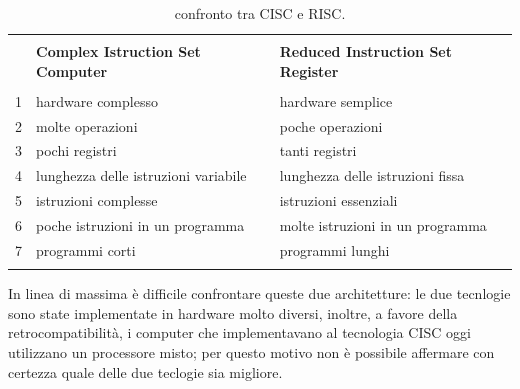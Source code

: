 \documentclass{article}
\begin{document}
\begin{table}[h]
	\centering
	\begin{tabular}{|l l l|}
		\hline
			& & \\
		  & \textbf{Complex Istruction Set Computer} & \textbf{Reduced Instruction Set Register} \\
			& & \\
		1 & hardware complesso & hardware semplice \\
	 	2 & molte operazioni   & poche operazioni  \\
		3 & pochi registri     & tanti registri    \\
		4 & lunghezza delle istruzioni variabile & lunghezza delle istruzioni fissa \\
		5 & istruzioni complesse & istruzioni essenziali \\
		6 & poche istruzioni in un programma & molte istruzioni in un programma\\
		7 & programmi corti & programmi lunghi\\
		  & & \\
		\hline
	\end{tabular}
	\caption{confronto tra CISC e RISC.}
\end{table}

In linea di massima è difficile confrontare queste due architetture: le due tecnlogie sono state implementate in hardware molto diversi, inoltre, a favore della retrocompatibilità, i computer che implementavano al tecnologia CISC oggi utilizzano un processore misto; per questo motivo non è possibile affermare con certezza quale delle due teclogie sia migliore.





\end{document}
